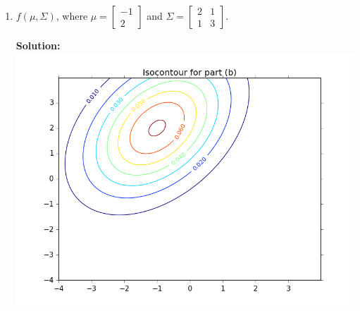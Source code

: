 \documentclass{article}
\newcommand{\solution}{\textbf{Solution: }}
\begin{document}
\begin{enumerate}[label=(\alph*)]
    \newpage
    \item $f(\mu, \Sigma)$, where $\mu = \begin{bmatrix}-1 \\ 2 \end{bmatrix}$ and $\Sigma = \begin{bmatrix} 2 & 1  \\ 1 & 3 \end{bmatrix}$. 
    \begin{mdframed} \solution\\
    \includegraphics[scale=.75]{images/isocontour_b.png}
    \end{mdframed}
    

\end{enumerate}
\end{document}
